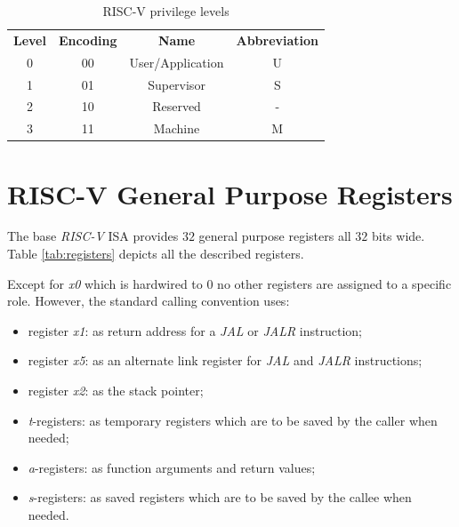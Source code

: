\begin{table}
  \centering
  \begin{tabular}{|c|c|c|c|}
    \hline
    \textbf{Level}  & \textbf{Encoding} & \textbf{Name}    & \textbf{Abbreviation} \\
    \hhline{====} 0 & 00                & User/Application & U                     \\
    \hline
    1               & 01                & Supervisor       & S                     \\
    \hline
    2               & 10                & Reserved         & -                     \\
    \hline
    3               & 11                & Machine          & M                     \\
    \hline
  \end{tabular}
  \caption{RISC-V privilege levels}
  \label{tab:priv}
\end{table}

\section{RISC-V General Purpose Registers}
\label{sec:riscv_reg}

The base \textit{RISC-V} ISA provides $32$ general purpose registers all $32$
bits wide. Table \ref{tab:registers} depicts all the described registers.

Except for \textit{x0} which is hardwired to $0$ no other registers are assigned
to a specific role. However, the standard calling convention uses:
\begin{itemize}
  \item register \textit{x1}: as return address for a \textit{JAL} or \textit{JALR}
    instruction;

  \item register \textit{x5}: as an alternate link register for \textit{JAL} and
    \textit{JALR} instructions;

  \item register \textit{x2}: as the stack pointer;

  \item \textit{t}-registers: as temporary registers which are to be saved by the
    caller when needed;

  \item \textit{a}-registers: as function arguments and return values;

  \item \textit{s}-registers: as saved registers which are to be saved by the callee
    when needed.
\end{itemize}

